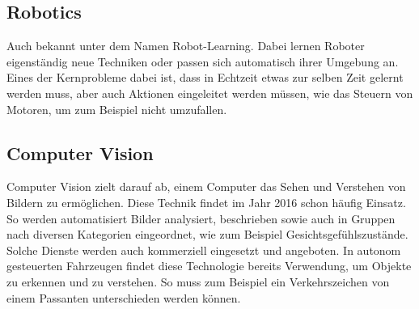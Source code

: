 \subsection{Robotics}
\label{subsec:Robotics}

Auch bekannt unter dem Namen Robot-Learning. 
Dabei lernen Roboter eigenständig neue Techniken oder passen sich automatisch ihrer Umgebung an. 
Eines der Kernprobleme dabei ist, dass in Echtzeit etwas zur selben Zeit gelernt werden muss, aber auch Aktionen eingeleitet werden müssen, wie das Steuern von Motoren, um zum Beispiel nicht umzufallen.

\subsection{Computer Vision}
\label{subsec:Cumputer Vision}

Computer Vision zielt darauf ab, einem Computer das Sehen und Verstehen von Bildern zu ermöglichen. 
Diese Technik findet im Jahr 2016 schon häufig Einsatz. 
So werden automatisiert Bilder analysiert, beschrieben sowie auch in Gruppen nach diversen Kategorien eingeordnet, wie zum Beispiel Gesichtsgefühlszustände.
Solche Dienste werden auch kommerziell eingesetzt und angeboten. 
In autonom gesteuerten Fahrzeugen findet diese Technologie bereits Verwendung, um Objekte zu erkennen und zu verstehen. 
So muss zum Beispiel ein Verkehrszeichen von einem Passanten unterschieden werden können.



